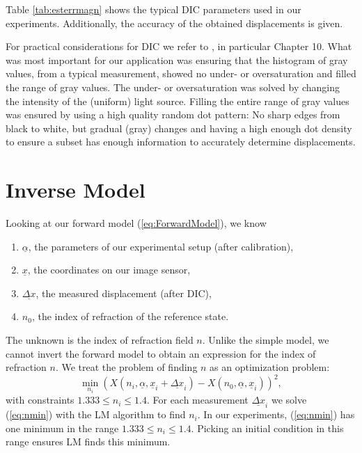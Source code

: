 \documentclass{svjour3}                     %
\begin{document}
Table \ref{tab:esterrmagn} shows the typical DIC parameters used in our experiments. Additionally, the accuracy of the obtained displacements is given.

For practical considerations for DIC we refer to \cite{sutton2009image}, in particular Chapter 10. What was most important for our application was ensuring that the histogram of gray values, from a typical measurement, showed no under- or oversaturation and filled the range of gray values. The under- or oversaturation was solved by changing the intensity of the (uniform) light source. Filling the entire range of gray values was ensured by using a high quality random dot pattern: No sharp edges from black to white, but gradual (gray) changes and having a high enough dot density to ensure a subset has enough information to accurately determine displacements. %

\section{Inverse Model}
\label{sec:invmod}
Looking at our forward model (\ref{eq:ForwardModel}), we know
\begin{enumerate}
	\item $\underline{\alpha}$, the parameters of our experimental setup (after calibration), 
	\item $\underline{x}$, the coordinates on our image sensor, 
	\item $\underline{\Delta x}$, the measured displacement (after DIC), 
	\item $n_0$, the index of refraction of the reference state.
\end{enumerate}
The unknown is the index of refraction field $n$. Unlike the simple model, we cannot invert the forward model to obtain an expression for the index of refraction $n$. We treat the problem of finding $n$ as an optimization problem:
\begin{equation}
\label{eq:nmin} 
	\min_{n_i} (X(n_i, \underline{\alpha}, \underline{x}_i+\underline{\Delta x}_i) - X(n_0, \underline{\alpha}, \underline{x}_i))^2, 
\end{equation}
with constraints $1.333 \leq n_i \leq 1.4$. For each measurement $\underline{\Delta x}_i$ we solve (\ref{eq:nmin}) with the LM algorithm to find $n_i$. In our experiments, (\ref{eq:nmin}) has one minimum in the range $1.333 \leq n_i \leq 1.4$. Picking an initial condition in this range ensures LM finds this minimum.
\end{document}
